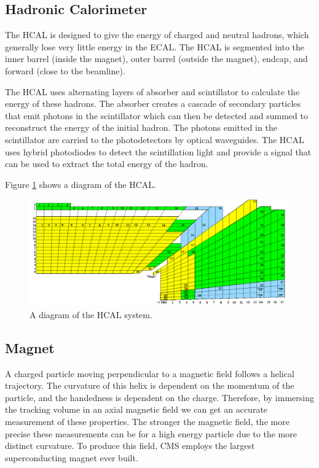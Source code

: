 \subsection{Hadronic Calorimeter}
The HCAL is designed to give the energy of charged and neutral hadrons, which generally lose very little energy in the ECAL.  
The HCAL is segmented into the inner barrel (inside the magnet), outer barrel (outside the magnet), endcap, and forward (close to the beamline).  

The HCAL uses alternating layers of absorber and scintillator to calculate the energy of these hadrons.  
The absorber creates a cascade of secondary particles that emit photons in the scintillator which can then be detected and summed to reconstruct the energy of the initial hadron.  
The photons emitted in the scintillator are carried to the photodetectors by optical waveguides.  
The HCAL uses hybrid photodiodes to detect the scintillation light and provide a signal that can be used to extract the total energy of the hadron.  

Figure \ref{figs:CMShcal} shows a diagram of the HCAL.   
\begin{figure}
\begin{center}
\includegraphics[width=1.0\linewidth]{figs/CMShcal.png}
\caption{A diagram of the HCAL system.}
\label{figs:CMShcal}
\end{center}
\end{figure}
  
\subsection{Magnet}
A charged particle moving perpendicular to a magnetic field follows a helical trajectory.  
The curvature of this helix is dependent on the momentum of the particle, and the handedness is dependent on the charge.  
Therefore, by immersing the tracking volume in an axial magnetic field we can get an accurate measurement of these properties.  
The stronger the magnetic field, the more precise these measurements can be for a high energy particle due to the more distinct curvature.  
To produce this field, CMS employs the largest superconducting magnet ever built.  

